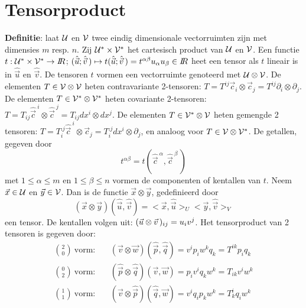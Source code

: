 \documentclass[twoside]{report}
\begin{document}
\section{Tensorproduct}
{\bf Definitie}: laat $\cal U$ en $\cal V$ twee eindig dimensionale vectorruimten
zijn met dimensies $m$ resp. $n$. Zij $\cal U^*\times V^*$ het cartesisch
product van $\cal U$ en $\cal V$. Een functie $t:{\cal U^*\times V^*}\rightarrow I\hspace{-1mm}R$;
$(\hat{\vec{u}};\hat{\vec{v}}\,)\mapsto t(\hat{\vec{u}};\hat{\vec{v}}\,)=t^{\alpha\beta}u_\alpha u_\beta\in I\hspace{-1mm}R$
heet een tensor als $t$ lineair is in $\hat{\vec{u}}$ en $\hat{\vec{v}}$.
De tensoren $t$ vormen een vectorruimte genoteerd met $\cal U\otimes V$.
De elementen $T\in\cal V\otimes V$ heten contravariante 2-tensoren:
$T=T^{ij}\vec{c}_i\otimes\vec{c}_j=T^{ij}\partial_i\otimes\partial_j$. De
elementen $T\in\cal V^*\otimes V^*$ heten covariante 2-tensoren:
$T=T_{ij}\hat{\vec{c}}^{~i}\otimes\hat{\vec{c}}^{~j}=T_{ij}dx^i\otimes dx^j$.
De elementen $T\in\cal V^*\otimes V$ heten gemengde 2 tensoren:
$T=T_i^{.j}\hat{\vec{c}}^{~i}\otimes\vec{c}_j=T_i^{.j}dx^i\otimes\partial_j$,
en analoog voor $T\in\cal V\otimes V^*$.
\npar
De getallen, gegeven door
\[
t^{\alpha\beta}=t(\hat{\vec{c}}^{~\alpha},\hat{\vec{c}}^{~\beta}\,)
\]
met $1\leq\alpha\leq m$ en $1\leq\beta\leq n$ vormen de componenten of
kentallen van $t$.
\npar
Neem $\vec{x}\in\cal U$ en $\vec{y}\in\cal V$. Dan is de functie
$\vec{x}\otimes\vec{y}$, gedefinieerd door
\[
(\vec{x}\otimes\vec{y})(\hat{\vec{u}},\hat{\vec{v}})=<\vec{x},\hat{\vec{u}}>_U<\vec{y},\hat{\vec{v}}>_V
\]
een tensor. De kentallen volgen uit: $(\vec{u}\otimes\vec{v}\,)_{ij}=u_iv^j$.
Het tensorproduct van 2 tensoren is gegeven door:
\begin{eqnarray*}
{2\choose0}~\mbox{vorm:}~&&(\vec{v}\otimes\vec{w})(\hat{\vec{p}},\hat{\vec{q}})=v^ip_iw^kq_k=T^{ik}p_iq_k\\
{0\choose2}~\mbox{vorm:}~&&(\hat{\vec{p}}\otimes\hat{\vec{q}})(\vec{v},\vec{w})=p_iv^iq_kw^k=T_{ik}v^iw^k\\
{1\choose1}~\mbox{vorm:}~&&(\vec{v}\otimes\hat{\vec{p}})(\hat{\vec{q}},\vec{w})=v^iq_ip_kw^k=T_k^iq_iw^k
\end{eqnarray*}
\end{document}
